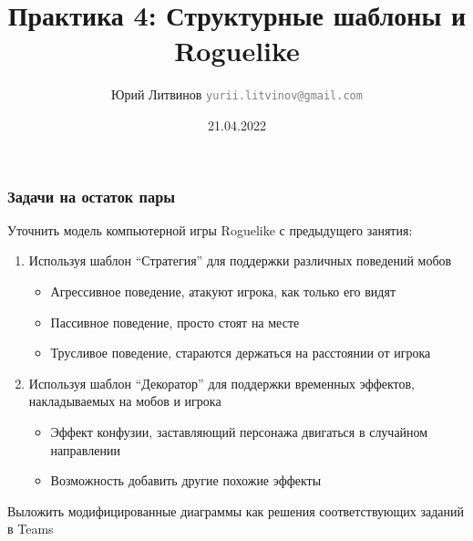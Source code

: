 \documentclass[xetex,mathserif,serif]{beamer}
\title{Практика 4: Структурные шаблоны и Roguelike}
\author[Юрий Литвинов]{Юрий Литвинов \newline \textcolor{gray}{\small\texttt{yurii.litvinov@gmail.com}}}
\date{21.04.2022}
\begin{document}
    
    \frame{\titlepage}

    \begin{frame}
        \frametitle{Задачи на остаток пары}
        Уточнить модель компьютерной игры Roguelike с предыдущего занятия:

        \begin{enumerate}
            \item Используя шаблон ``Стратегия'' для поддержки различных поведений мобов
            \begin{itemize}
                \item Агрессивное поведение, атакуют игрока, как только его видят
                \item Пассивное поведение, просто стоят на месте
                \item Трусливое поведение, стараются держаться на расстоянии от игрока
            \end{itemize}
            \item Используя шаблон ``Декоратор'' для поддержки временных эффектов, накладываемых на мобов и игрока
            \begin{itemize}
                \item Эффект конфузии, заставляющий персонажа двигаться в случайном направлении
                \item Возможность добавить другие похожие эффекты
            \end{itemize}
        \end{enumerate}

        Выложить модифицированные диаграммы как решения соответствующих заданий в Teams
    \end{frame}
\end{document}
